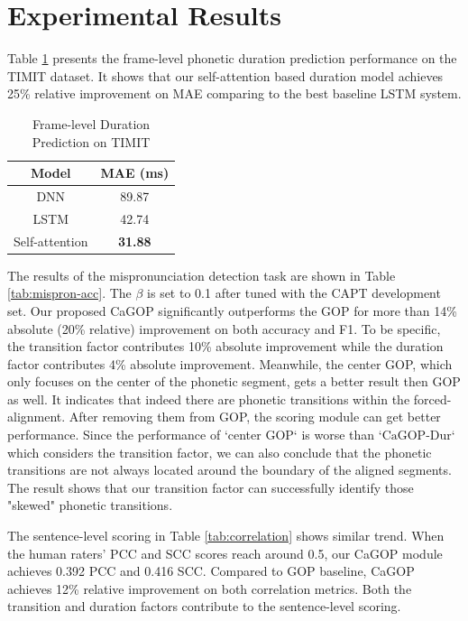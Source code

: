 \documentclass[a4paper]{article}
\begin{document}
\section{Experimental Results}
Table \ref{tab:Duration Model} presents the frame-level phonetic duration prediction performance on the TIMIT dataset. It shows that our self-attention based duration model achieves 25\% relative improvement on MAE comparing to the best baseline LSTM system.

\vspace{-6pt}
\begin{table}[th]
  \caption{Frame-level Duration Prediction on TIMIT}
  \label{tab:Duration Model}
  \vspace{-4pt}
  \centering
  \begin{tabular}{ c  c }
    \toprule
    \textbf{Model} & \textbf{MAE (ms)} \\
    \midrule
     DNN \cite{henter2016robust} & 89.87 \\
     \hline
     LSTM \cite{chen2017discrete} & 42.74 \\
     \hline
     Self-attention  &   \textbf{31.88}   \\
    \bottomrule
  \end{tabular}
\end{table}
\vspace{-10pt}

The results of the mispronunciation detection task are shown in Table \ref{tab:mispron-acc}. The $\beta$ is set to 0.1 after tuned with the CAPT development set. Our proposed CaGOP significantly outperforms the GOP for more than 14\% absolute (20\% relative) improvement on both accuracy and F1. To be specific, the transition factor contributes 10\% absolute improvement while the duration factor contributes 4\% absolute improvement. Meanwhile, the center GOP, which only focuses on the center of the phonetic segment, gets a better result then GOP as well. It indicates that indeed there are phonetic transitions within the forced-alignment. After removing them from GOP, the scoring module can get better performance. Since the performance of `center GOP`  is worse than `$\text{CaGOP-Dur}$` which considers the transition factor, we can also conclude that the phonetic transitions are not always located around the boundary of the aligned segments. The result shows that our transition factor can successfully identify those "skewed" phonetic transitions.

The sentence-level scoring in Table \ref{tab:correlation} shows similar trend. When the human raters' PCC and SCC scores reach around 0.5, our CaGOP module achieves 0.392 PCC and 0.416 SCC. Compared to GOP baseline, CaGOP achieves 12\% relative improvement on both correlation metrics. Both the transition and duration factors contribute to the sentence-level scoring.
\end{document}
